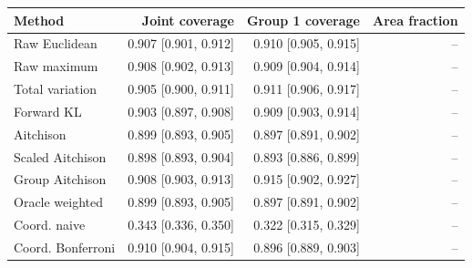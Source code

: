 \begin{tabular}{lrrr}
\toprule
Method & Joint coverage & Group 1 coverage & Area fraction \\
\midrule
Raw Euclidean & 0.907 [0.901, 0.912] & 0.910 [0.905, 0.915] & -- \\
Raw maximum & 0.908 [0.902, 0.913] & 0.909 [0.904, 0.914] & -- \\
Total variation & 0.905 [0.900, 0.911] & 0.911 [0.906, 0.917] & -- \\
Forward KL & 0.903 [0.897, 0.908] & 0.909 [0.903, 0.914] & -- \\
Aitchison & 0.899 [0.893, 0.905] & 0.897 [0.891, 0.902] & -- \\
Scaled Aitchison & 0.898 [0.893, 0.904] & 0.893 [0.886, 0.899] & -- \\
Group Aitchison & 0.908 [0.903, 0.913] & 0.915 [0.902, 0.927] & -- \\
Oracle weighted & 0.899 [0.893, 0.905] & 0.897 [0.891, 0.902] & -- \\
Coord. naive & 0.343 [0.336, 0.350] & 0.322 [0.315, 0.329] & -- \\
Coord. Bonferroni & 0.910 [0.904, 0.915] & 0.896 [0.889, 0.903] & -- \\
\bottomrule
\end{tabular}
